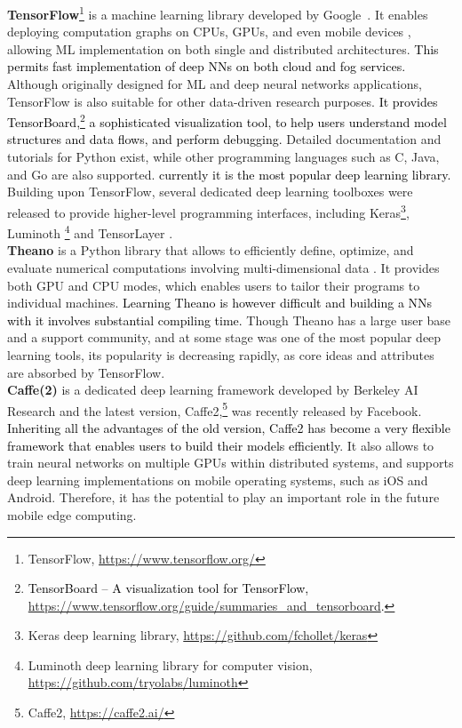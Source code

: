 \documentclass[journal,comsoc,letter]{IEEEtran}
\newcommand{\edit}[1]{\textcolor{black}{#1}}
\newcommand{\rev}[1]{\textcolor{black}{#1}}
\begin{document}
\noindent \textbf{TensorFlow}\footnote{TensorFlow, \url{https://www.tensorflow.org/}} is a machine learning library developed by Google~\cite{tensorflow2015-whitepaper}. It enables deploying computation graphs on CPUs, GPUs, and even mobile devices \cite{alzantot2017rstensorflow}, allowing ML implementation on both single and distributed architectures. \rev{This permits fast implementation of deep NNs on both cloud and fog services.} Although originally designed for ML and deep neural networks applications, TensorFlow is also suitable for other data-driven research purposes. \rev{It provides TensorBoard,\footnote{\rev{TensorBoard -- A visualization tool for TensorFlow, \url{https://www.tensorflow.org/guide/summaries_and_tensorboard}.}} a sophisticated visualization tool, to help users understand model structures and data flows, and perform debugging. } Detailed documentation and tutorials for Python exist, while other programming languages such as C, Java, and Go are also supported. \edit{currently it is the most popular deep learning library.} Building upon TensorFlow, several dedicated deep learning toolboxes were released to provide higher-level programming interfaces, including Keras\footnote{Keras deep learning library, \url{https://github.com/fchollet/keras}}, Luminoth \footnote{Luminoth deep learning library for computer vision, \url{https://github.com/tryolabs/luminoth}} and TensorLayer \cite{tensorlayer}. \\

\noindent \textbf{Theano} is a Python library that allows to efficiently define, optimize, and evaluate numerical computations involving multi-dimensional data  \cite{2016arXiv160502688short}. It provides both GPU and CPU modes, which enables users to tailor their programs to individual machines. \edit{Learning Theano is however difficult and building a NNs with it involves substantial compiling time.} Though Theano has a large user base and a support community, and at some stage was one of the most popular deep learning tools, its popularity is decreasing rapidly, as core ideas and attributes are absorbed by TensorFlow.\\

\noindent \textbf{Caffe(2)} is a dedicated deep learning framework developed by Berkeley AI Research \cite{jia2014caffe} and the latest version, Caffe2,\footnote{Caffe2, \url{https://caffe2.ai/}} was recently released by Facebook. \edit{Inheriting all the advantages of the old version, Caffe2 has become a very flexible framework that enables users to build their models efficiently}.  It also allows to train neural networks on multiple GPUs within distributed systems, and supports deep learning implementations on mobile operating systems, such as iOS and Android. Therefore, it has the potential to play an important role in the future mobile edge computing.\\
\end{document}
